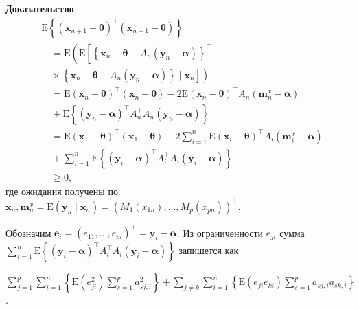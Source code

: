 \textbf{Доказательство} 
\begin{equation}
    \begin{aligned}
        & \mathrm{E}\left\{\left(\mathbf{x}_{n+1}-\boldsymbol{\theta}\right)^{\top}\left(\mathbf{x}_{n+1}-\boldsymbol{\theta}\right)\right\} \\
        & \quad=\mathrm{E}\left(\mathrm { E } \left[\left\{\mathbf{x}_{n}-\boldsymbol{\theta}-A_{n}\left(\mathbf{y}_{n}-\boldsymbol{\alpha}\right)\right\}^{\top}\right.\right. \\
        & \left.\left.\quad \times\left\{\mathbf{x}_{n}-\boldsymbol{\theta}-A_{n}\left(\mathbf{y}_{n}-\boldsymbol{\alpha}\right)\right\} \mid \mathbf{x}_{n}\right]\right) \\
        & \quad=\mathrm{E}\left(\mathbf{x}_{n}-\boldsymbol{\theta}\right)^{\top}\left(\mathbf{x}_{n}-\boldsymbol{\theta}\right)-2 \mathrm{E}\left(\mathbf{x}_{n}-\boldsymbol{\theta}\right)^{\top} A_{n}\left(\mathbf{m}_{n}^{x}-\boldsymbol{\alpha}\right) \\
        & \quad+\mathrm{E}\left\{\left(\mathbf{y}_{n}-\boldsymbol{\alpha}\right)^{\top} A_{n}^{\top} A_{n}\left(\mathbf{y}_{n}-\boldsymbol{\alpha}\right)\right\} \\
        & \quad=\mathrm{E}\left(\mathbf{x}_{1}-\boldsymbol{\theta}\right)^{\top}\left(\mathbf{x}_{1}-\boldsymbol{\theta}\right)-2 \sum_{i=1}^{n} \mathrm{E}\left(\mathbf{x}_{i}-\boldsymbol{\theta}\right)^{\top} A_{i}\left(\mathbf{m}_{i}^{x}-\boldsymbol{\alpha}\right) \\
        & \quad+\sum_{i=1}^{n} \mathrm{E}\left\{\left(\mathbf{y}_{i}-\boldsymbol{\alpha}\right)^{\top} A_{i}^{\top} A_{i}\left(\mathbf{y}_{i}-\boldsymbol{\alpha}\right)\right\} \\
        & \quad \geq 0,
    \end{aligned} 
\end{equation}
где ожидания получены по $\mathbf{x}_{n}, \mathbf{m}_{n}^{x}=
\mathrm{E}\left(\mathbf{y}_{n} \mid \mathbf{x}_{n}\right)=\left(M_{1}\left(x_{1 n}\right),
\ldots, M_{p}\left(x_{p n}\right)\right)^{\top}$.
 
Обозначим $\mathbf{e}_{i}=\left(e_{11}, \ldots,e_{p i}\right)^{\top}=\mathbf{y}_{i}-\boldsymbol{\alpha}$. 
Из ограниченности $e_{j i}$ сумма $\sum_{i=1}^{n} \mathrm{E}\left\{\left(\mathbf{y}_{i}-\boldsymbol{\alpha}\right)^{\top} A_{i}^{\top} A_{i}\left(\mathbf{y}_{i}-\boldsymbol{\alpha}\right)\right\}$ запишется как 

$\sum_{j=1}^{p} \sum_{i=1}^{n}\left\{\mathrm{E}\left(e_{j i}^{2}\right) \sum_{s=1}^{p} a_{s j, i}^{2}\right\}+\sum_{j \neq k} \sum_{i=1}^{n}\left\{\mathrm{E}\left(e_{j i} e_{k i}\right) \sum_{s=1}^{p} a_{s j, i} a_{s k, i}\right\}$.

